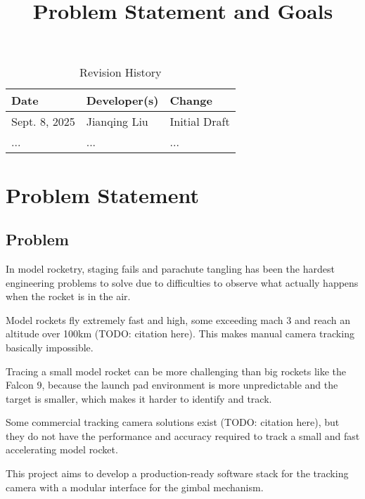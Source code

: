\documentclass{article}
\title{Problem Statement and Goals\\\progname}
\author{\authname}
\date{}
\begin{document}
\maketitle

\begin{table}[hp]
\caption{Revision History} \label{TblRevisionHistory}
\begin{tabularx}{\textwidth}{llX}
\toprule
\textbf{Date} & \textbf{Developer(s)} & \textbf{Change}\\
\midrule
Sept. 8, 2025 & Jianqing Liu & Initial Draft\\
... & ... & ...\\
\bottomrule
\end{tabularx}
\end{table}

\section{Problem Statement}



\subsection{Problem}

In model rocketry, staging fails and parachute tangling has been the hardest engineering problems 
to solve due to difficulties to observe what actually happens when the rocket is in the air.

Model rockets fly extremely fast and high, some exceeding mach 3 and reach an altitude over 100km (TODO: citation here).
This makes manual camera tracking basically impossible.

Tracing a small model rocket can be more challenging than big rockets like the Falcon 9, because the
launch pad environment is more unpredictable and the target is smaller, which makes it harder to identify 
and track.

Some commercial tracking camera solutions exist (TODO: citation here), but they do not have the performance and 
accuracy required to track a small and fast accelerating model rocket.

This project aims to develop a production-ready software stack for the tracking camera with a modular 
interface for the gimbal mechanism.
\end{document}
